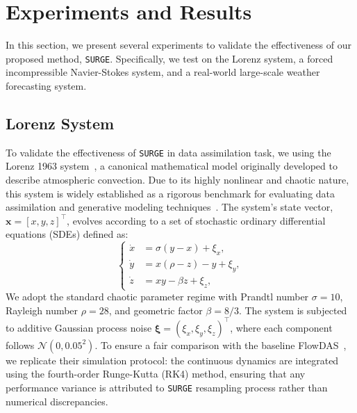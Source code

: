 \documentclass{article}
\theoremstyle{plain}
\theoremstyle{definition}
\theoremstyle{remark}
\begin{document}



\section{Experiments and Results}

In this section, we present several experiments to validate the effectiveness of our proposed method, \texttt{SURGE}. Specifically, we test on the Lorenz system, a forced incompressible Navier-Stokes system, and a real-world large-scale weather forecasting system.

\subsection{Lorenz System}
To validate the effectiveness of \texttt{SURGE} in data assimilation task, we using the Lorenz 1963 system~\cite{DeterministicNonperiodicFlow}, a canonical mathematical model originally developed to describe atmospheric convection. Due to its highly nonlinear and chaotic nature, this system is widely established as a rigorous benchmark for evaluating data assimilation and generative modeling techniques~\cite{song2020score,chen2025flowdas}.
The system's state vector, $\mathbf{x} = [x, y, z]^\top$, evolves according to a set of stochastic ordinary differential equations (SDEs) defined as:
$$\begin{cases}
\dot{x} &= \sigma(y - x) + \xi_x, \\
\dot{y} &= x(\rho - z) - y + \xi_y, \\
\dot{z} &= xy - \beta z + \xi_z,
\end{cases}$$
We adopt the standard chaotic parameter regime with Prandtl number $\sigma=10$, Rayleigh number $\rho=28$, and geometric factor $\beta=8/3$. The system is subjected to additive Gaussian process noise $\boldsymbol{\xi}=(\xi_x, \xi_y, \xi_z)^\top$, where each component follows $\mathcal{N}(0, 0.05^2)$. To ensure a fair comparison with the baseline FlowDAS~\cite{chen2025flowdas}, we replicate their simulation protocol: the continuous dynamics are integrated using the fourth-order Runge-Kutta (RK4) method, ensuring that any performance variance is attributed to \texttt{SURGE} resampling process rather than numerical discrepancies.
\end{document}
